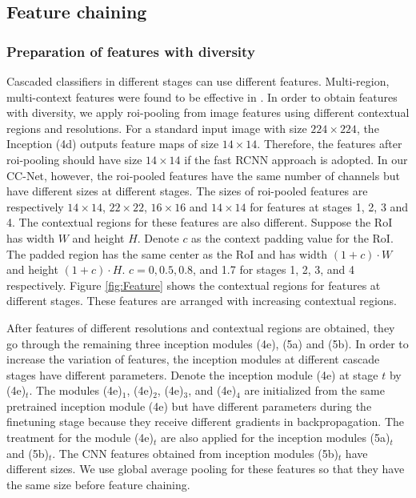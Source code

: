 \documentclass[10pt,twocolumn,letterpaper]{article}
\begin{document}
\subsection{Feature chaining}
\label{Sec:FeatChain}
\subsubsection{Preparation of features with diversity}
Cascaded classifiers in different stages can use different features. Multi-region, multi-context features were found to be effective in \cite{bell2015inside, gidaris2015object, zeng2016gated}. In order to obtain features with diversity, we apply roi-pooling from image features using different contextual regions and resolutions.  For a standard input image with size $224\times 224$, the Inception (4d) outputs feature maps of size $14\times 14$. Therefore, the features after roi-pooling should have size $14\times 14$ if the fast RCNN approach is adopted. In our CC-Net, however, the roi-pooled features have the same number of channels but have different sizes at different stages. The sizes of roi-pooled features are respectively $14\times 14$, $22\times 22$, $16\times 16$ and $14\times 14$ for features at stages 1, 2, 3 and 4. The contextual regions for these features are also different. Suppose the RoI has width $W$ and height $H$.  Denote $c$ as the context padding value for the RoI. The padded region has the same center as the RoI and has width $(1+c)\cdot W$ and height $(1+c)\cdot H$. $c=0, 0.5,  0.8$, and 1.7 for stages 1, 2, 3, and 4 respectively.  Figure \ref{fig:Feature} shows the contextual regions for features at different stages.  These features are arranged with increasing contextual regions.

After features of different resolutions and contextual regions are obtained, they go through the remaining three inception modules (4e), (5a) and (5b). In order to increase the variation of features, the inception modules  at different cascade stages have different parameters. Denote the inception module (4e) at stage $t$ by  (4e)$_t$.  The modules (4e)$_1$, (4e)$_2$, (4e)$_3$, and (4e)$_4$  are initialized from the same pretrained inception module (4e) but have different parameters during the finetuning stage because they receive different gradients in  backpropagation. The treatment for the module (4e)$_t$ are also applied for the inception modules (5a)$_t$ and (5b)$_t$. The CNN features obtained from inception modules (5b)$_t$ have different sizes. We use global average pooling for these features so that they have the same size before feature chaining.
\end{document}

